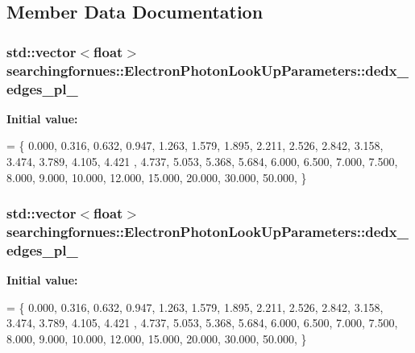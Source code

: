 \subsection{Member Data Documentation}
\subsubsection[{\texorpdfstring{dedx\+\_\+edges\+\_\+pl\+\_\+0}{dedx_edges_pl_0}}]{\setlength{\rightskip}{0pt plus 5cm}std\+::vector$<$float$>$ searchingfornues\+::\+Electron\+Photon\+Look\+Up\+Parameters\+::dedx\+\_\+edges\+\_\+pl\+\_}\hypertarget{structsearchingfornues_1_1ElectronPhotonLookUpParameters_a300cec1b80f70901447441d365b02e0b}{}\label{structsearchingfornues_1_1ElectronPhotonLookUpParameters_a300cec1b80f70901447441d365b02e0b}
{\bfseries Initial value\+:}
\begin{DoxyCode}
= \{
    0.000, 0.316, 0.632, 0.947, 1.263, 1.579, 1.895, 2.211, 2.526, 2.842, 3.158, 3.474, 3.789, 4.105, 4.421
      , 4.737, 5.053, 5.368, 5.684, 6.000,
    6.500, 7.000, 7.500, 8.000, 9.000, 10.000, 12.000, 15.000, 20.000, 30.000, 50.000,
    \}
\end{DoxyCode}
\subsubsection[{\texorpdfstring{dedx\+\_\+edges\+\_\+pl\+\_\+1}{dedx_edges_pl_1}}]{\setlength{\rightskip}{0pt plus 5cm}std\+::vector$<$float$>$ searchingfornues\+::\+Electron\+Photon\+Look\+Up\+Parameters\+::dedx\+\_\+edges\+\_\+pl\+\_}\hypertarget{structsearchingfornues_1_1ElectronPhotonLookUpParameters_aa85c81bd9cf420ac4aff8e6c0e3fa0fd}{}\label{structsearchingfornues_1_1ElectronPhotonLookUpParameters_aa85c81bd9cf420ac4aff8e6c0e3fa0fd}
{\bfseries Initial value\+:}
\begin{DoxyCode}
= \{
    0.000, 0.316, 0.632, 0.947, 1.263, 1.579, 1.895, 2.211, 2.526, 2.842, 3.158, 3.474, 3.789, 4.105, 4.421
      , 4.737, 5.053, 5.368, 5.684, 6.000,
    6.500, 7.000, 7.500, 8.000, 9.000, 10.000, 12.000, 15.000, 20.000, 30.000, 50.000,
    \}
\end{DoxyCode}
